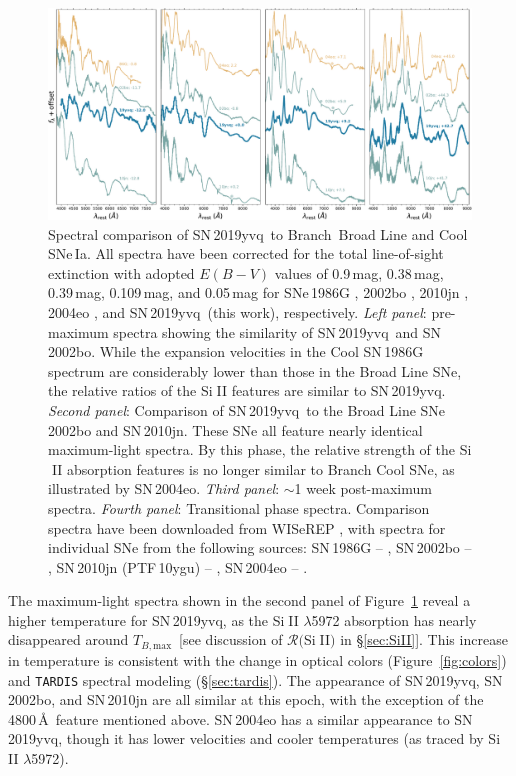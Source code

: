 \documentclass[twocolumn]{aastex63}
\def\ion#1#2{#1$\;${\footnotesize\rm{#2}}\relax}
\newcommand{\tbmax}{$T_{B,\mathrm{max}}$}
\newcommand{\sn}{SN\,2019yvq}
\begin{document}
\begin{figure}
    \centering
    \includegraphics[width=\textwidth]{./figures/spec_comp_extinction.pdf}
    \caption{Spectral comparison of \sn\ to Branch~Broad Line
    and Cool SNe\,Ia. All spectra have been corrected for the total
    line-of-sight extinction with adopted $E(B-V)$ values of 0.9\,mag,
    0.38\,mag, 0.39\,mag, 0.109\,mag, and 0.05\,mag for SNe\,1986G
    \citep{Phillips87}, 2002bo \citep{Stehle05}, 2010jn \citep{Hachinger13},
    2004eo \citep{Pastorello07}, and \sn\ (this work), respectively.
    \textit{Left panel}: pre-maximum spectra showing the similarity of \sn\
    and SN\,2002bo. While the expansion velocities in the Cool SN\,1986G
    spectrum are considerably lower than those in the Broad Line SNe, the
    relative ratios of the \ion{Si}{II} features are similar to \sn.
    \textit{Second panel}: Comparison of \sn\ to the Broad Line SNe\,2002bo
    and SN\,2010jn. These SNe all feature nearly identical maximum-light
    spectra. By this phase, the relative strength of the \ion{Si}{II}
    absorption features is no longer similar to Branch Cool SNe, as
    illustrated by SN\,2004eo. \textit{Third panel}: $\sim$1 week post-maximum
    spectra. \textit{Fourth panel}: Transitional phase spectra. Comparison
    spectra have been downloaded from WISeREP \citep{Yaron12}, with spectra
    for individual SNe from the following sources: SN\,1986G --
    \citet{Cristiani92}, SN\,2002bo -- \citet{Benetti04,Silverman11},
    SN\,2010jn (PTF\,10ygu) -- \citet{Hachinger13,Maguire14}, SN\,2004eo --
    \citet{Pastorello07}.}
    \label{fig:spec_comp}
\end{figure}

The maximum-light spectra shown in the second panel of
Figure~\ref{fig:spec_comp} reveal a higher temperature for \sn, as the
\ion{Si}{II} $\lambda$5972 absorption has nearly disappeared around \tbmax\
[see discussion of $\mathcal{R}($\ion{Si}{II}$)$ in \S\ref{sec:SiII}]. This
increase in temperature is consistent with the change in optical colors
(Figure~\ref{fig:colors}) and \texttt{TARDIS} spectral modeling
(\S\ref{sec:tardis}). The appearance of \sn, SN\,2002bo, and SN\,2010jn are
all similar at this epoch, with the exception of the 4800\,\AA\ feature
mentioned above. SN\,2004eo has a similar appearance to \sn, though it has
lower velocities and cooler temperatures (as traced by \ion{Si}{II}
$\lambda$5972).
\end{document}
